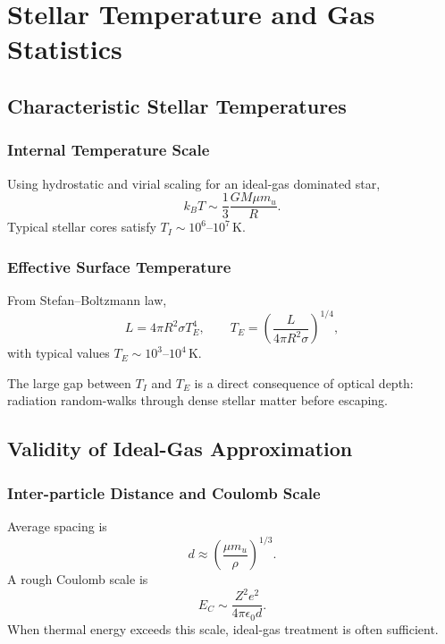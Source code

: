\chapter{Stellar Temperature and Gas Statistics}

\section{Characteristic Stellar Temperatures}

\subsection{Internal Temperature Scale}
\begin{theory}
Using hydrostatic and virial scaling for an ideal-gas dominated star,
\begin{equation}
    k_B T \sim \frac{1}{3}\frac{GM\mu m_u}{R}.
\end{equation}
Typical stellar cores satisfy $T_I\sim 10^6$--$10^7\,$K.
\end{theory}

\subsection{Effective Surface Temperature}
\begin{theory}
From Stefan--Boltzmann law,
\begin{equation}
    L=4\pi R^2\sigma T_E^4,
    \qquad
    T_E=\left(\frac{L}{4\pi R^2\sigma}\right)^{1/4},
\end{equation}
with typical values $T_E\sim10^3$--$10^4\,$K.
\end{theory}

\begin{remark}
The large gap between $T_I$ and $T_E$ is a direct consequence of optical depth: radiation random-walks through dense stellar matter before escaping.
\end{remark}

\section{Validity of Ideal-Gas Approximation}

\subsection{Inter-particle Distance and Coulomb Scale}
\begin{foundation}
Average spacing is
\begin{equation}
    d \approx \left(\frac{\mu m_u}{\rho}\right)^{1/3}.
\end{equation}
A rough Coulomb scale is
\begin{equation}
    E_C \sim \frac{Z^2e^2}{4\pi\epsilon_0 d}.
\end{equation}
When thermal energy exceeds this scale, ideal-gas treatment is often sufficient.
\end{foundation}

